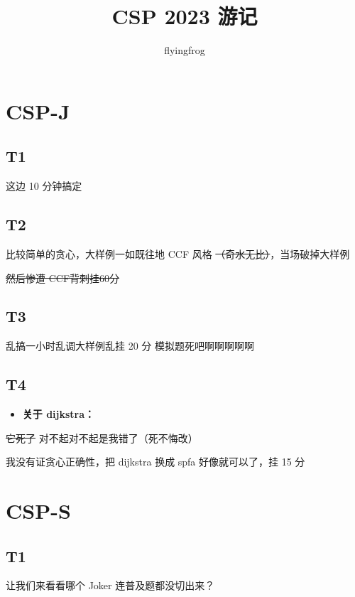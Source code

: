 \documentclass[a4paper, 12pt]{article}
\begin{document}
\title{CSP 2023 游记}
\author{flyingfrog}
\maketitle

\section{CSP-J}

\subsection{T1}

这边 10 分钟搞定

\subsection{T2}

比较简单的贪心，大样例一如既往地 CCF 风格 {\sout{（奇水无比）}}，当场破掉大样例

{\sout{然后惨遭 CCF背刺挂60分}}

\subsection{T3}

乱搞一小时\quad 乱调大样例\quad 乱挂 20 分
{\Huge{模拟题死吧啊啊啊啊啊}}

\subsection{T4}

\begin{itemize}
    \item \textbf{关于 dijkstra：}
\end{itemize}

\sout{它死了} 对不起对不起是我错了（死不悔改）

我没有证贪心正确性，把 dijkstra 换成 spfa 好像就可以了，挂 15 分

\section{CSP-S}

\subsection{T1}

让我们来看看哪个 Joker 连普及题都没切出来？
\end{document}
